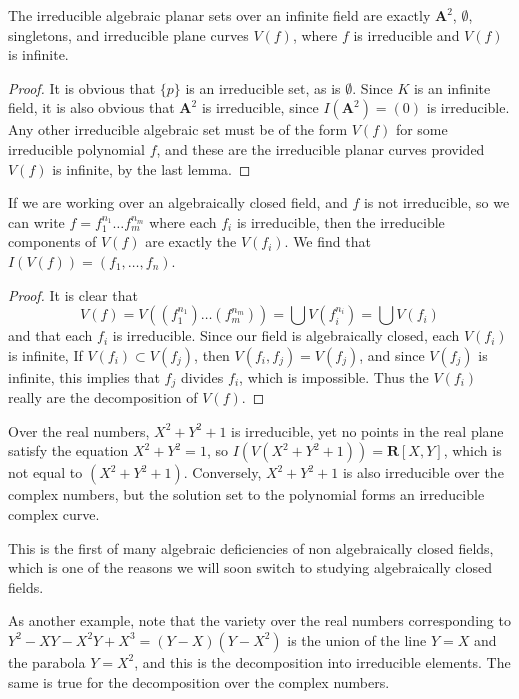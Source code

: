 \begin{corollary}
    The irreducible algebraic planar sets over an infinite field are exactly $\mathbf{A}^2$, $\emptyset$, singletons, and irreducible plane curves $V(f)$, where $f$ is irreducible and $V(f)$ is infinite.
\end{corollary}
\begin{proof}
    It is obvious that $\{ p \}$ is an irreducible set, as is $\emptyset$. Since $K$ is an infinite field, it is also obvious that $\mathbf{A}^2$ is irreducible, since $I(\mathbf{A}^2) = (0)$ is irreducible. Any other irreducible algebraic set must be of the form $V(f)$ for some irreducible polynomial $f$, and these are the irreducible planar curves provided $V(f)$ is infinite, by the last lemma.
\end{proof}

\begin{corollary}
    If we are working over an algebraically closed field, and $f$ is not irreducible, so we can write $f = f_1^{n_1} \dots f_m^{n_m}$ where each $f_i$ is irreducible, then the irreducible components of $V(f)$ are exactly the $V(f_i)$. We find that $I(V(f)) = (f_1, \dots, f_n)$.
\end{corollary}
\begin{proof}
    It is clear that
    \[ V(f) = V((f_1^{n_1}) \dots (f_m^{n_m})) = \bigcup V(f_i^{n_i}) = \bigcup V(f_i) \]
    and that each $f_i$ is irreducible. Since our field is algebraically closed, each $V(f_i)$ is infinite, If $V(f_i) \subset V(f_j)$, then $V(f_i,f_j) = V(f_j)$, and since $V(f_j)$ is infinite, this implies that $f_j$ divides $f_i$, which is impossible. Thus the $V(f_i)$ really are the decomposition of $V(f)$.
\end{proof}

\begin{example}
    Over the real numbers, $X^2 + Y^2 + 1$ is irreducible, yet no points in the real plane satisfy the equation $X^2 + Y^2 = 1$, so $I(V(X^2 + Y^2 + 1)) = \mathbf{R}[X,Y]$, which is not equal to $(X^2 + Y^2 + 1)$. Conversely, $X^2 + Y^2 + 1$ is also irreducible over the complex numbers, but the solution set to the polynomial forms an irreducible complex curve.
\end{example}

This is the first of many algebraic deficiencies of non algebraically closed fields, which is one of the reasons we will soon switch to studying algebraically closed fields.

\begin{example}
    As another example, note that the variety over the real numbers corresponding to $Y^2 - XY - X^2Y + X^3 = (Y - X)(Y - X^2)$ is the union of the line $Y = X$ and the parabola $Y = X^2$, and this is the decomposition into irreducible elements. The same is true for the decomposition over the complex numbers.
\end{example}

